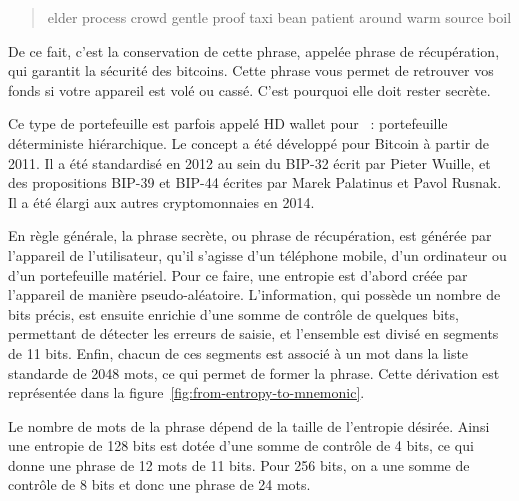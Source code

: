 
\begin{quote}
elder process crowd gentle proof taxi bean patient around warm source boil
\end{quote}

De ce fait, c'est la conservation de cette phrase, appelée phrase de récupération, qui garantit la sécurité des bitcoins. Cette phrase vous permet de retrouver vos fonds si votre appareil est volé ou cassé. C'est pourquoi elle doit rester secrète. %

Ce type de portefeuille est parfois appelé HD wallet pour ~: portefeuille déterministe hiérarchique. Le concept a été développé pour Bitcoin à partir de 2011. Il a été standardisé en 2012 au sein du BIP-32 écrit par Pieter Wuille, et des propositions BIP-39 et BIP-44 écrites par Marek Palatinus et Pavol Rusnak. Il a été élargi aux autres cryptomonnaies en 2014.


En règle générale, la phrase secrète, ou phrase de récupération, est générée par l'appareil de l'utilisateur, qu'il s'agisse d'un téléphone mobile, d'un ordinateur ou d'un portefeuille matériel. Pour ce faire, une entropie est d'abord créée par l'appareil de manière pseudo-aléatoire. L'information, qui possède un nombre de bits précis, est ensuite enrichie d'une somme de contrôle de quelques bits, permettant de détecter les erreurs de saisie, et l'ensemble est divisé en segments de 11 bits. Enfin, chacun de ces segments est associé à un mot dans la liste standarde de 2048 mots, ce qui permet de former la phrase. Cette dérivation est représentée dans la figure~\ref{fig:from-entropy-to-mnemonic}.

Le nombre de mots de la phrase dépend de la taille de l'entropie désirée. Ainsi une entropie de 128 bits est dotée d'une somme de contrôle de 4 bits, ce qui donne une phrase de 12 mots de 11 bits. Pour 256 bits, on a une somme de contrôle de 8 bits et donc une phrase de 24 mots.

